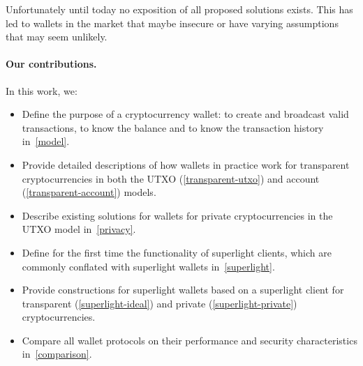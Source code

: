 Unfortunately until today no exposition of all proposed solutions exists. This has led to wallets in the market that maybe insecure or have varying assumptions that may seem unlikely.

\paragraph{Our contributions.} In this work, we:
\begin{itemize}
    \item Define the purpose of a cryptocurrency wallet: to create and broadcast valid transactions, to know the balance and to know the transaction history in~\cref{model}.
    \item Provide detailed descriptions of how wallets in practice work for transparent cryptocurrencies in both the UTXO (\cref{transparent-utxo}) and account (\cref{transparent-account}) models.
    \item Describe existing solutions for wallets for private cryptocurrencies in the UTXO model in~\cref{privacy}.
    \item Define for the first time the functionality of superlight clients, which are commonly conflated with superlight wallets in~\cref{superlight}.
    \item Provide constructions for superlight wallets based on a superlight client for transparent (\cref{superlight-ideal}) and private (\cref{superlight-private}) cryptocurrencies.
    \item Compare all wallet protocols on their performance and security characteristics in~\cref{comparison}.
\end{itemize}
